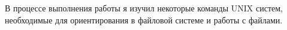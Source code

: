 В процессе выполнения работы я изучил некоторые команды UNIX систем, необходимые для ориентирования в файловой системе и работы с файлами.